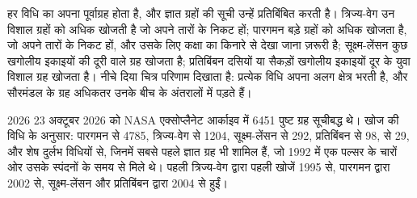हर विधि का अपना पूर्वाग्रह होता है, और ज्ञात ग्रहों की सूची
उन्हें प्रतिबिंबित करती है। त्रिज्य-वेग उन विशाल ग्रहों को अधिक खोजती है जो
अपने तारों के निकट हों; पारगमन बड़े ग्रहों को अधिक खोजता है, जो अपने तारों के निकट हों, और
उसके लिए कक्षा का किनारे से देखा जाना ज़रूरी है; सूक्ष्म-लेंसन कुछ खगोलीय इकाइयों की दूरी वाले ग्रह खोजता है;
प्रतिबिंबन दसियों या सैकड़ों खगोलीय इकाइयों दूर के युवा विशाल ग्रह खोजता है।
नीचे दिया चित्र परिणाम दिखाता है: प्रत्येक विधि अपना अलग क्षेत्र भरती है, और
सौरमंडल के ग्रह अधिकतर उनके बीच के अंतरालों में पड़ते हैं।

\begin{dated}{2026}
23 अक्टूबर 2026 को NASA एक्सोप्लैनेट आर्काइव में 6451 पुष्ट
ग्रह सूचीबद्ध थे। खोज की विधि के अनुसार: पारगमन से 4785, त्रिज्य-वेग से 1204,
सूक्ष्म-लेंसन से 292, प्रतिबिंबन से 98,  से 29, और शेष
दुर्लभ विधियों से, जिनमें सबसे पहले ज्ञात ग्रह भी शामिल हैं,
जो 1992 में एक पल्सर के चारों ओर उसके स्पंदनों के समय से मिले थे। पहली
त्रिज्य-वेग द्वारा पहली खोजें 1995 से, पारगमन द्वारा 2002 से, सूक्ष्म-लेंसन
और प्रतिबिंबन द्वारा 2004 से हुईं।
\end{dated}

